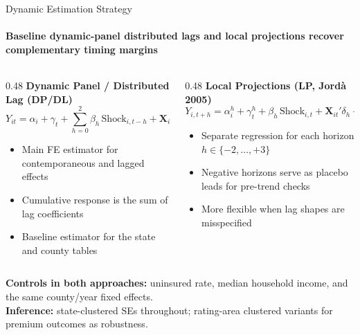 \documentclass[aspectratio=169,11pt]{beamer}
\newcommand{\tealtext}[1]{{\color{Teal}#1}}
\begin{document}
\begin{frame}{Dynamic Estimation Strategy}
  \framesubtitle{Baseline dynamic-panel distributed lags and local projections recover complementary timing margins}
  \begin{columns}[T]
    \begin{column}{0.48\textwidth}
      \textbf{\tealtext{Dynamic Panel / Distributed Lag (DP/DL)}}\\[0.25em]
      \footnotesize
      \[
      Y_{it} = \alpha_i + \gamma_t + \sum_{h=0}^{2}\beta_h \, \text{Shock}_{i,t-h}
      + \mathbf{X}_{it}'\delta + \varepsilon_{it}
      \]
      \begin{itemize}\itemsep0.18em
        \item Main FE estimator for contemporaneous and lagged effects
        \item Cumulative response is the sum of lag coefficients
        \item Baseline estimator for the state and county tables
      \end{itemize}
    \end{column}
    \begin{column}{0.48\textwidth}
      \textbf{\tealtext{Local Projections (LP, Jord\`a 2005)}}\\[0.25em]
      \footnotesize
      \[
      Y_{i,t+h} = \alpha_i^h + \gamma_t^h + \beta_h \, \text{Shock}_{i,t}
      + \mathbf{X}_{it}'\delta_h + \varepsilon_{i,t+h}
      \]
      \begin{itemize}\itemsep0.18em
        \item Separate regression for each horizon $h \in \{-2, \ldots, +3\}$
        \item Negative horizons serve as placebo leads for pre-trend checks
        \item More flexible when lag shapes are misspecified
      \end{itemize}
    \end{column}
  \end{columns}
  \vspace{0.25em}
  \scriptsize
  \textbf{Controls in both approaches:} uninsured rate, median household income, and the same county/year fixed effects.\\
  \textbf{Inference:} state-clustered SEs throughout; rating-area clustered variants for premium outcomes as robustness.
\end{frame}
\end{document}
